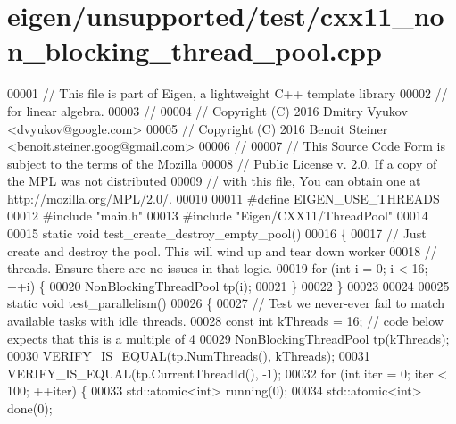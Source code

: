 \hypertarget{eigen_2unsupported_2test_2cxx11__non__blocking__thread__pool_8cpp_source}{}\section{eigen/unsupported/test/cxx11\+\_\+non\+\_\+blocking\+\_\+thread\+\_\+pool.cpp}
\label{eigen_2unsupported_2test_2cxx11__non__blocking__thread__pool_8cpp_source}

\begin{DoxyCode}
00001 \textcolor{comment}{// This file is part of Eigen, a lightweight C++ template library}
00002 \textcolor{comment}{// for linear algebra.}
00003 \textcolor{comment}{//}
00004 \textcolor{comment}{// Copyright (C) 2016 Dmitry Vyukov <dvyukov@google.com>}
00005 \textcolor{comment}{// Copyright (C) 2016 Benoit Steiner <benoit.steiner.goog@gmail.com>}
00006 \textcolor{comment}{//}
00007 \textcolor{comment}{// This Source Code Form is subject to the terms of the Mozilla}
00008 \textcolor{comment}{// Public License v. 2.0. If a copy of the MPL was not distributed}
00009 \textcolor{comment}{// with this file, You can obtain one at http://mozilla.org/MPL/2.0/.}
00010 
00011 \textcolor{preprocessor}{#define EIGEN\_USE\_THREADS}
00012 \textcolor{preprocessor}{#include "main.h"}
00013 \textcolor{preprocessor}{#include "Eigen/CXX11/ThreadPool"}
00014 
00015 \textcolor{keyword}{static} \textcolor{keywordtype}{void} test\_create\_destroy\_empty\_pool()
00016 \{
00017   \textcolor{comment}{// Just create and destroy the pool. This will wind up and tear down worker}
00018   \textcolor{comment}{// threads. Ensure there are no issues in that logic.}
00019   \textcolor{keywordflow}{for} (\textcolor{keywordtype}{int} i = 0; i < 16; ++i) \{
00020     NonBlockingThreadPool tp(i);
00021   \}
00022 \}
00023 
00024 
00025 \textcolor{keyword}{static} \textcolor{keywordtype}{void} test\_parallelism()
00026 \{
00027   \textcolor{comment}{// Test we never-ever fail to match available tasks with idle threads.}
00028   \textcolor{keyword}{const} \textcolor{keywordtype}{int} kThreads = 16;  \textcolor{comment}{// code below expects that this is a multiple of 4}
00029   NonBlockingThreadPool tp(kThreads);
00030   VERIFY\_IS\_EQUAL(tp.NumThreads(), kThreads);
00031   VERIFY\_IS\_EQUAL(tp.CurrentThreadId(), -1);
00032   \textcolor{keywordflow}{for} (\textcolor{keywordtype}{int} iter = 0; iter < 100; ++iter) \{
00033     std::atomic<int> running(0);
00034     std::atomic<int> done(0);

\end{DoxyCode}
